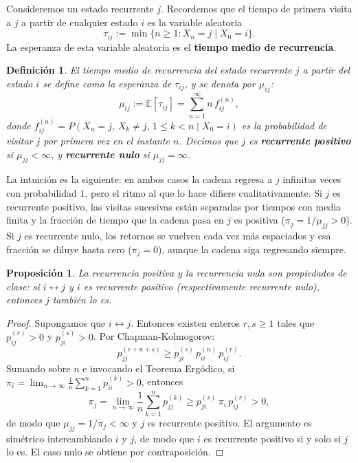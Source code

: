 \documentclass[12pt]{book}
\newtheorem{definition}{Definición}[chapter]
\newtheorem{proposition}{Proposición}[chapter]
\begin{document}
Consideremos un estado recurrente $j$. Recordemos que el tiempo de primera visita a $j$ a partir de cualquier estado $i$ es la variable aleatoria
\[
    \tau_{ij} := \min\{n \ge 1 : X_n = j \mid X_0 = i\}.
\]
La esperanza de esta variable aleatoria es el \textbf{tiempo medio de recurrencia}.

\begin{definition}
    El tiempo medio de recurrencia del estado recurrente $j$ a partir del estado $i$ se define como la esperanza de $\tau_{ij}$, y se denota por $\mu_{ij}$:
    \[
        \mu_{ij} := \mathbb{E}[\tau_{ij}] = \sum_{n=1}^{\infty} n\, f_{ij}^{(n)},
    \]
    donde $f_{ij}^{(n)} = P(X_n = j,\, X_k \neq j,\, 1\le k < n \mid X_0 = i)$ es la probabilidad de visitar $j$ por primera vez en el instante $n$. Decimos que $j$ es \textbf{recurrente positivo} si $\mu_{jj} < \infty$, y \textbf{recurrente nulo} si $\mu_{jj} = \infty$.
\end{definition}

La intuición es la siguiente: en ambos casos la cadena regresa a $j$ infinitas veces con probabilidad $1$, pero el ritmo al que lo hace difiere cualitativamente. Si $j$ es recurrente positivo, las visitas sucesivas están separadas por tiempos con media finita y la fracción de tiempo que la cadena pasa en $j$ es positiva ($\pi_j = 1/\mu_{jj} > 0$). Si $j$ es recurrente nulo, los retornos se vuelven cada vez más espaciados y esa fracción se diluye hasta cero ($\pi_j = 0$), aunque la cadena siga regresando siempre.

\begin{proposition}
    La recurrencia positiva y la recurrencia nula son propiedades de clase: si $i \leftrightarrow j$ y $i$ es recurrente positivo (respectivamente recurrente nulo), entonces $j$ también lo es.
\end{proposition}

\begin{proof}
    Supongamos que $i \leftrightarrow j$. Entonces existen enteros $r, s \ge 1$ tales que $p_{ij}^{(r)} > 0$ y $p_{ji}^{(s)} > 0$. Por Chapman-Kolmogorov:
    \[
        p_{jj}^{(r+n+s)} \ge p_{ji}^{(s)}\, p_{ii}^{(n)}\, p_{ij}^{(r)}.
    \]
    Sumando sobre $n$ e invocando el Teorema Ergódico, si $\pi_i = \lim_{n\to\infty}\frac{1}{n}\sum_{k=1}^n p_{ii}^{(k)} > 0$, entonces
    \[
        \pi_j = \lim_{n\to\infty}\frac{1}{n}\sum_{k=1}^n p_{jj}^{(k)} \ge p_{ji}^{(s)}\,\pi_i\, p_{ij}^{(r)} > 0,
    \]
    de modo que $\mu_{jj} = 1/\pi_j < \infty$ y $j$ es recurrente positivo. El argumento es simétrico intercambiando $i$ y $j$, de modo que $i$ es recurrente positivo si y solo si $j$ lo es. El caso nulo se obtiene por contraposición.
\end{proof}
\end{document}

